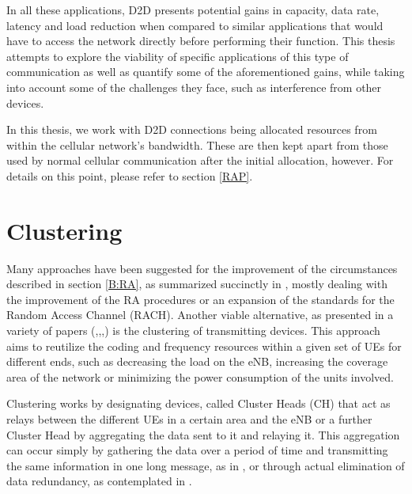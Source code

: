 In all these applications, D2D presents potential gains in capacity, data rate, latency and load reduction when compared to similar applications that would have to access the network directly before performing their function. This thesis attempts to explore the viability of specific applications of this type of communication as well as quantify some of the aforementioned gains, while taking into account some of the challenges they face, such as interference from other devices.

In this thesis, we work with D2D connections being allocated resources from within the cellular network's bandwidth. These are then kept apart from those used by normal cellular communication after the initial allocation, however. For details on this point, please refer to section \ref{RAP}.

\section{Clustering}\label{B:Cl}

Many approaches have been suggested for the improvement of the circumstances described in section \ref{B:RA}, as summarized succinctly in \cite{Laya2014}, mostly dealing with the improvement of the RA procedures or an expansion of the standards for the Random Access Channel (RACH). Another viable alternative, as presented in a variety of papers (\cite{Wei2012a},\cite{Laya2014a},\cite{Wang2013},\cite{Liao2013}) is the clustering of transmitting devices. This approach aims to reutilize the coding and frequency resources within a given set of UEs for different ends, such as decreasing the load on the eNB, increasing the coverage area of the network or minimizing the power consumption of the units involved.

Clustering works by designating devices, called Cluster Heads (CH) that act as relays between the different UEs in a certain area and the eNB or a further Cluster Head by aggregating the data sent to it and relaying it. This aggregation can occur simply by gathering the data over a period of time and transmitting the same information in one long message, as in \cite{Shariatmadari2015}, or through actual elimination of data redundancy, as contemplated in \cite{Riker2015}.

